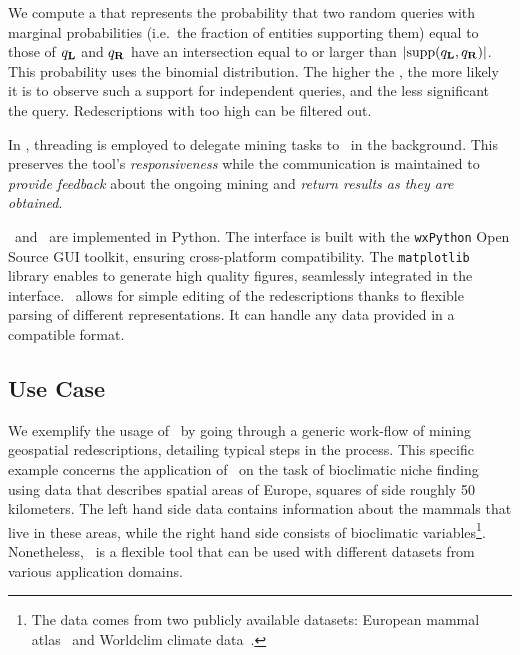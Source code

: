 We compute a
\pValue{} that represents the probability that two random queries with
marginal probabilities (i.e.\ the fraction of entities supporting
them) equal to those of $q_{\mathbf{L}}$ and $q_{\mathbf{R}}$ have an intersection
equal to or larger than $\abs{\supp(q_\iLHS, q_\iRHS)}$. This
probability uses the binomial distribution. The higher the \pValue,
the more likely it is to observe such a support for independent
queries, and the less significant the query. Redescriptions with too
high \pValue{} can be filtered out.

In \Siren, threading is employed to delegate mining tasks to \ReReMi\ in the background. This preserves the tool's
\emph{responsiveness} while the communication is maintained to \emph{provide feedback}
about the ongoing mining and \emph{return results as they are obtained}.

\Siren\ and \ReReMi\ are implemented in Python.  The interface is
built with the \texttt{wxPython} Open Source GUI toolkit, ensuring
cross-platform compatibility. 
 The \texttt{matplotlib} library enables
to generate high quality figures, seamlessly integrated in the
interface.  \Siren\ allows for simple editing of the redescriptions
thanks to flexible parsing of different representations. It can handle
any data provided in a compatible format.  

\subsection{Use Case}
\label{sec:scenarios}



We exemplify the usage of \Siren\ by going through a generic work-flow
of mining geospatial redescriptions, detailing typical steps in the
process.  This specific example concerns the application of \Siren\ on
the task of bioclimatic niche finding using data that describes
spatial areas of Europe, squares of side roughly 50 kilometers.  The
left hand side data contains information about the mammals that live
in these areas, while the right hand side consists of bioclimatic
variables\footnote{The data comes from two publicly available
  datasets: European mammal atlas~\cite{mitchell-jones99atlas} and
  Worldclim climate data~\cite{hijmans05very}.}.  Nonetheless, \Siren\
is a flexible tool that can be used with different datasets from
various application domains.

